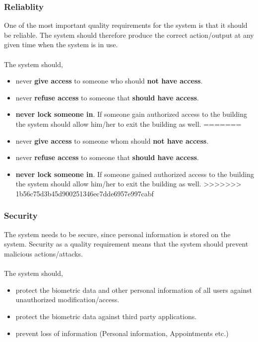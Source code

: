 \subsubsection{Reliablity}
One of the most important quality requirements for the system is that it should be reliable.
The system should therefore produce the correct action/output at any given time when the system is in use.\\
\\The system should,
\begin{itemize}
<<<<<<< HEAD
	\item  never \textbf{give access} to someone who should \textbf{not have access}.
	\item  never \textbf{refuse access} to someone that\textbf{ should have access}. 
	\item  \textbf{never lock someone in}. If someone gain authorized access to the building the system should 				allow him/her to exit the building as well.
=======
	\item  never \textbf{give access} to someone whom should \textbf{not have access}.
	\item  never \textbf{refuse access} to someone that\textbf{ should have access}. 
	\item  \textbf{never lock someone in}. If someone gained authorized access to the building the system should 				allow him/her to exit the building as well.
>>>>>>> 1b56c75d3b45d900251346ec7dde6957e997cabf
\end{itemize}

\subsubsection{Security}
The system needs to be secure, since personal information is stored on the system. Security as a quality requirement means that the system should prevent malicious actions/attacks.\\
\\The system should,
\begin{itemize}
	\item  protect the biometric data and other personal information of all users against unauthorized modification/access.
	\item  protect the biometric data against third party applications.
	\item  prevent loss of information (Personal information, Appointments etc.)
\end{itemize}

